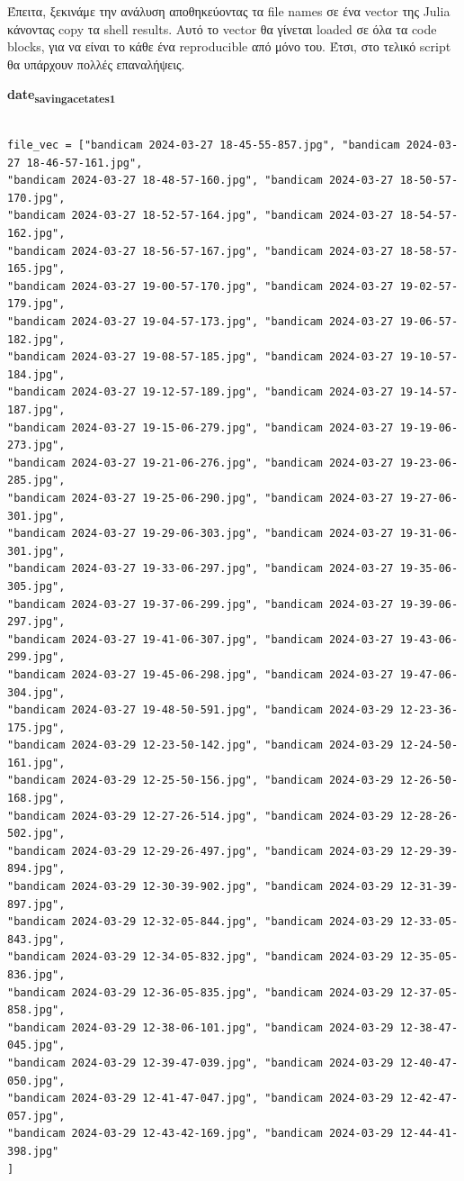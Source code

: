 \documentclass[11pt]{article}
\begin{document}
Έπειτα, ξεκινάμε την ανάλυση αποθηκεύοντας τα file names σε ένα vector της Julia κάνοντας copy τα shell results. Αυτό το vector θα γίνεται loaded σε όλα τα code blocks, για να είναι το κάθε ένα reproducible από μόνο του. Έτσι, στο τελικό script θα υπάρχουν πολλές επαναλήψεις.

\textbf{date\textsubscript{saving}\textsubscript{acetate}\textsubscript{s1}}
\begin{verbatim}

file_vec = ["bandicam 2024-03-27 18-45-55-857.jpg", "bandicam 2024-03-27 18-46-57-161.jpg",
"bandicam 2024-03-27 18-48-57-160.jpg", "bandicam 2024-03-27 18-50-57-170.jpg",
"bandicam 2024-03-27 18-52-57-164.jpg", "bandicam 2024-03-27 18-54-57-162.jpg",
"bandicam 2024-03-27 18-56-57-167.jpg", "bandicam 2024-03-27 18-58-57-165.jpg",
"bandicam 2024-03-27 19-00-57-170.jpg", "bandicam 2024-03-27 19-02-57-179.jpg",
"bandicam 2024-03-27 19-04-57-173.jpg", "bandicam 2024-03-27 19-06-57-182.jpg",
"bandicam 2024-03-27 19-08-57-185.jpg", "bandicam 2024-03-27 19-10-57-184.jpg",
"bandicam 2024-03-27 19-12-57-189.jpg", "bandicam 2024-03-27 19-14-57-187.jpg",
"bandicam 2024-03-27 19-15-06-279.jpg", "bandicam 2024-03-27 19-19-06-273.jpg",
"bandicam 2024-03-27 19-21-06-276.jpg", "bandicam 2024-03-27 19-23-06-285.jpg",
"bandicam 2024-03-27 19-25-06-290.jpg", "bandicam 2024-03-27 19-27-06-301.jpg",
"bandicam 2024-03-27 19-29-06-303.jpg", "bandicam 2024-03-27 19-31-06-301.jpg",
"bandicam 2024-03-27 19-33-06-297.jpg", "bandicam 2024-03-27 19-35-06-305.jpg",
"bandicam 2024-03-27 19-37-06-299.jpg", "bandicam 2024-03-27 19-39-06-297.jpg",
"bandicam 2024-03-27 19-41-06-307.jpg", "bandicam 2024-03-27 19-43-06-299.jpg",
"bandicam 2024-03-27 19-45-06-298.jpg", "bandicam 2024-03-27 19-47-06-304.jpg",
"bandicam 2024-03-27 19-48-50-591.jpg", "bandicam 2024-03-29 12-23-36-175.jpg",
"bandicam 2024-03-29 12-23-50-142.jpg", "bandicam 2024-03-29 12-24-50-161.jpg",
"bandicam 2024-03-29 12-25-50-156.jpg", "bandicam 2024-03-29 12-26-50-168.jpg",
"bandicam 2024-03-29 12-27-26-514.jpg", "bandicam 2024-03-29 12-28-26-502.jpg",
"bandicam 2024-03-29 12-29-26-497.jpg", "bandicam 2024-03-29 12-29-39-894.jpg",
"bandicam 2024-03-29 12-30-39-902.jpg", "bandicam 2024-03-29 12-31-39-897.jpg",
"bandicam 2024-03-29 12-32-05-844.jpg", "bandicam 2024-03-29 12-33-05-843.jpg",
"bandicam 2024-03-29 12-34-05-832.jpg", "bandicam 2024-03-29 12-35-05-836.jpg",
"bandicam 2024-03-29 12-36-05-835.jpg", "bandicam 2024-03-29 12-37-05-858.jpg",
"bandicam 2024-03-29 12-38-06-101.jpg", "bandicam 2024-03-29 12-38-47-045.jpg",
"bandicam 2024-03-29 12-39-47-039.jpg", "bandicam 2024-03-29 12-40-47-050.jpg",
"bandicam 2024-03-29 12-41-47-047.jpg", "bandicam 2024-03-29 12-42-47-057.jpg",
"bandicam 2024-03-29 12-43-42-169.jpg", "bandicam 2024-03-29 12-44-41-398.jpg"
]

\end{verbatim}
\end{document}
